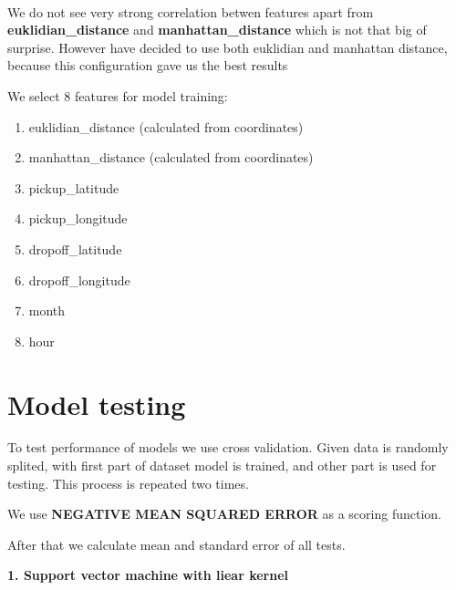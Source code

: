 \documentclass[11pt]{article}
\providecommand{\tightlist}{%
      \setlength{\itemsep}{0pt}\setlength{\parskip}{0pt}}
\begin{document}
    \begin{center}
    \end{center}
    { \hspace*{\fill} \\}
    
    We do not see very strong correlation betwen features apart from
\textbf{euklidian\_distance} and \textbf{manhattan\_distance} which is
not that big of surprise. However have decided to use both euklidian and
manhattan distance, because this configuration gave us the best results

    

    We select 8 features for model training:

\begin{enumerate}
\def\labelenumi{\arabic{enumi}.}
\tightlist
\item
  euklidian\_distance (calculated from coordinates)
\item
  manhattan\_distance (calculated from coordinates)
\item
  pickup\_latitude
\item
  pickup\_longitude
\item
  dropoff\_latitude
\item
  dropoff\_longitude
\item
  month
\item
  hour
\end{enumerate}

    \section{Model testing}\label{model-testing}

    To test performance of models we use cross validation. Given data is
randomly splited, with first part of dataset model is trained, and other
part is used for testing. This process is repeated two times.

We use \textbf{NEGATIVE MEAN SQUARED ERROR} as a scoring function.

After that we calculate mean and standard error of all tests.

    

    \textbf{1. Support vector machine with liear kernel}
\end{document}
